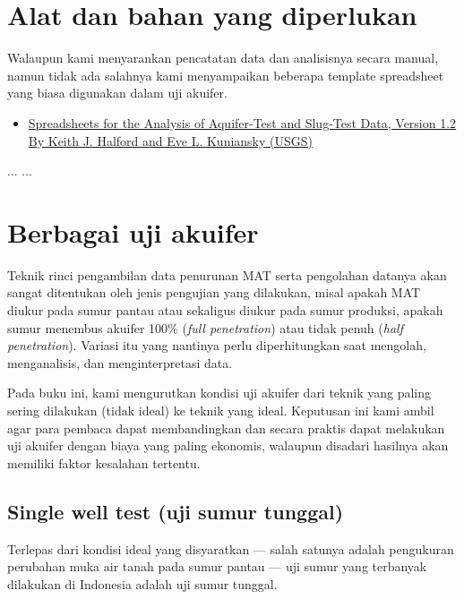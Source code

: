 \section{Alat dan bahan yang diperlukan}

Walaupun kami menyarankan pencatatan data dan analisisnya secara manual, namun tidak ada salahnya kami menyampaikan beberapa template spreadsheet yang biasa digunakan dalam uji akuifer.

\begin{itemize}
\item \href{https://pubs.usgs.gov/of/2002/ofr02197/}{Spreadsheets for the Analysis of Aquifer-Test and Slug-Test Data, Version 1.2 By Keith J. Halford and Eve L. Kuniansky (USGS)} 
\end{itemize}

...
...


\section{Berbagai uji akuifer}

Teknik rinci pengambilan data penurunan MAT serta pengolahan datanya akan sangat ditentukan oleh jenis pengujian yang dilakukan, misal apakah MAT diukur pada sumur pantau atau sekaligus diukur pada sumur produksi, apakah sumur menembus akuifer 100\% (\textit{full penetration}) atau tidak penuh (\textit{half penetration}). Variasi itu yang nantinya perlu diperhitungkan saat mengolah, menganalisis, dan menginterpretasi data. 

Pada buku ini, kami mengurutkan kondisi uji akuifer dari teknik yang paling sering dilakukan (tidak ideal) ke teknik yang ideal. Keputusan ini kami ambil agar para pembaca dapat membandingkan dan secara praktis dapat melakukan uji akuifer dengan biaya yang paling ekonomis, walaupun disadari hasilnya akan memiliki faktor kesalahan tertentu.


\subsection{Single well test (uji sumur tunggal)}

Terlepas dari kondisi ideal yang disyaratkan — salah satunya adalah pengukuran perubahan muka air tanah pada sumur pantau — uji sumur yang terbanyak dilakukan di Indonesia adalah uji sumur tunggal.  
